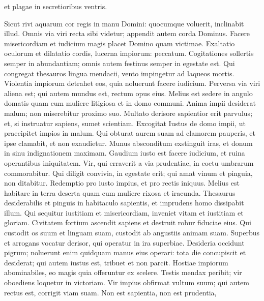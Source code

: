 \begin{biblechapter}
\begin{biblechapter}
\begin{biblechapter}
\begin{biblechapter}
\begin{biblechapter}
\begin{biblechapter}
\begin{biblechapter}
\begin{biblechapter}
\begin{biblechapter}
\begin{biblechapter}
\begin{biblechapter}
\begin{biblechapter}
\begin{biblechapter}
\begin{biblechapter}
\begin{biblechapter}
\begin{biblechapter}
\begin{biblechapter}
\begin{biblechapter}
\begin{biblechapter}
\begin{biblechapter}
 et plagae in secretioribus ventris.
 
\begin{biblechapter}
 \verse Sicut rivi aquarum cor regis in manu Domini:
 quocumque voluerit, inclinabit illud.
 \verse Omnis via viri recta sibi videtur;
 appendit autem corda Dominus.
 \verse Facere misericordiam et iudicium
 magis placet Domino quam victimae.
 \verse Exaltatio oculorum et dilatatio cordis,
 lucerna impiorum: peccatum.
 \verse Cogitationes sollertis semper in abundantiam;
 omnis autem festinus semper in egestate est.
 \verse Qui congregat thesauros lingua mendacii,
 vento impingetur ad laqueos mortis.
 \verse Violentia impiorum detrahet eos,
 quia noluerunt facere iudicium.
 \verse Perversa via viri aliena est;
 qui autem mundus est, rectum opus eius.
 \verse Melius est sedere in angulo domatis
 quam cum muliere litigiosa et in domo communi.
 \verse Anima impii desiderat malum;
 non miserebitur proximo suo.
 \verse Multato derisore sapientior erit parvulus;
 et, si instruatur sapiens, sumet scientiam.
 \verse Excogitat Iustus de domo impii,
 ut praecipitet impios in malum.
 \verse Qui obturat aurem suam ad clamorem pauperis,
 et ipse clamabit, et non exaudietur.
 \verse Munus absconditum exstinguit iras,
 et donum in sinu indignationem maximam.
 \verse Gaudium iusto est facere iudicium,
 et ruina operantibus iniquitatem.
 \verse Vir, qui erraverit a via prudentiae,
 in coetu umbrarum commorabitur.
 \verse Qui diligit convivia, in egestate erit;
 qui amat vinum et pinguia, non ditabitur.
 \verse Redemptio pro iusto impius,
 et pro rectis iniquus.
 \verse Melius est habitare in terra deserta
 quam cum muliere rixosa et iracunda.
 \verse Thesaurus desiderabilis et pinguis in habitaculo sapientis,
 et imprudens homo dissipabit illum.
 \verse Qui sequitur iustitiam et misericordiam,
 inveniet vitam et iustitiam et gloriam.
 \verse Civitatem fortium ascendit sapiens
 et destruit robur fiduciae eius.
 \verse Qui custodit os suum et linguam suam,
 custodit ab angustiis animam suam.
 \verse Superbus et arrogans vocatur derisor,
 qui operatur in ira superbiae.
 \verse Desideria occidunt pigrum;
 noluerunt enim quidquam manus eius operari:
 \verse tota die concupiscit et desiderat;
 qui autem iustus est, tribuet et non parcit.
 \verse Hostiae impiorum abominabiles,
 eo magis quia offeruntur ex scelere.
 \verse Testis mendax peribit;
 vir oboediens loquetur in victoriam.
 \verse Vir impius obfirmat vultum suum;
 qui autem rectus est, corrigit viam suam.
 \verse Non est sapientia, non est prudentia,

\end{biblechapter}
\end{biblechapter}
\end{biblechapter}
\end{biblechapter}
\end{biblechapter}
\end{biblechapter}
\end{biblechapter}
\end{biblechapter}
\end{biblechapter}
\end{biblechapter}
\end{biblechapter}
\end{biblechapter}
\end{biblechapter}
\end{biblechapter}
\end{biblechapter}
\end{biblechapter}
\end{biblechapter}
\end{biblechapter}
\end{biblechapter}
\end{biblechapter}
\end{biblechapter}
